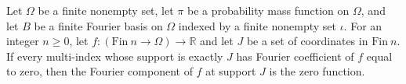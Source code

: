 \begin{theorem}
\label{FABL.FiniteFourierBasis.fourierComponentAtSupport_eq_zero}
\leanok
{}
Let $\Omega$ be a finite nonempty set, let $\pi$ be a probability mass function on
$\Omega$, and let $B$ be a finite Fourier basis on $\Omega$ indexed by a finite nonempty
set $\iota$. For an integer $n\ge 0$, let $f:(\mathrm{Fin}\ n\to\Omega)\to\mathbb R$ and
let $J$ be a set of coordinates in $\mathrm{Fin}\ n$. If every multi-index whose support
is exactly $J$ has Fourier coefficient of $f$ equal to zero, then the Fourier component
of $f$ at support $J$ is the zero function.
\end{theorem}

